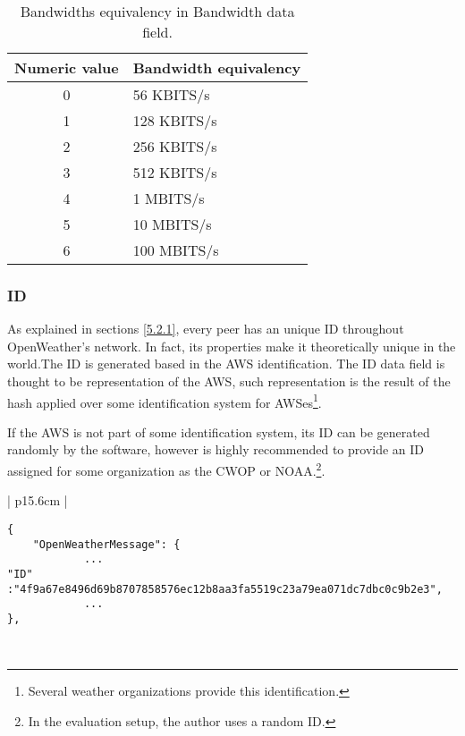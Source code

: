 \begin{table}[h]
\centering
\begin{tabular}{ | c | l |}
\hline
\textbf{Numeric value} & \textbf{Bandwidth equivalency} \\ \hline
0 & 56 \gls{KBITS}/s \\ \hline
1 & 128 \gls{KBITS}/s \\ \hline
2 & 256 \gls{KBITS}/s \\ \hline
3 & 512 \gls{KBITS}/s \\ \hline
4 & 1 \gls{MBITS}/s\\ \hline
5 & 10 \gls{MBITS}/s \\ \hline
6 & 100 \gls{MBITS}/s \\ \hline
\end{tabular}
\caption{Bandwidths equivalency in Bandwidth data field.}
\end{table}

\subsubsection{ID}

As explained in sections \ref{5.2.1}, every peer has an unique ID throughout OpenWeather's network. In fact, its properties make it theoretically unique in the world.The ID is generated based in the \gls{AWS} identification. The ID data field is thought to be representation of the \gls{AWS}, such representation is the result of the hash applied over some identification system for \gls{AWS}es\footnote{Several weather organizations provide this identification.}.

If the \gls{AWS} is not part of some identification system, its ID can be generated randomly by the software, however is highly recommended to provide an ID assigned for some organization as the \gls{CWOP} or \gls{NOAA}.\footnote{In the evaluation setup, the author uses a random ID.}.

\begin{table}[H]     
\centering
\begin{tabular}{| p{15.6cm} |}
\hline
\begin{minipage}[t]{\linewidth}
	\begin{verbatim}
{
    "OpenWeatherMessage": {
            ...
"ID" :"4f9a67e8496d69b8707858576ec12b8aa3fa5519c23a79ea071dc7dbc0c9b2e3",
            ...
},
      \end{verbatim}
\end{minipage} \\
\hline
\end{tabular}
\caption{ID's field in a data message of OpenWeather protocol.}
\end{table}


